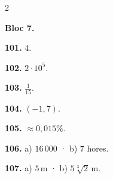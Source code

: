 \documentclass[13pt,a4paper]{extarticle}
\begin{document}
\begin{multicols}{2}
\begin{minipage}{\linewidth}
\textbf{Bloc 7.}\par
\end{minipage}\par\vspace{1.6mm}
\par\noindent\begin{minipage}{\linewidth}
\textbf{101.} $4$.\par
\end{minipage}\par\vspace{1.6mm}
\par\noindent\begin{minipage}{\linewidth}
\textbf{102.} $2\cdot10^5$.\par
\end{minipage}\par\vspace{1.6mm}
\par\noindent\begin{minipage}{\linewidth}
\textbf{103.} $\tfrac1{15}$.\par
\end{minipage}\par\vspace{1.6mm}
\par\noindent\begin{minipage}{\linewidth}
\textbf{104.} $\left(-1,7\right)$.\par
\end{minipage}\par\vspace{1.6mm}
\par\noindent\begin{minipage}{\linewidth}
\textbf{105.} $\approx0{,}015\%$.\par
\end{minipage}\par\vspace{1.6mm}
\par\noindent\begin{minipage}{\linewidth}
\textbf{106.} a) $16\,000$ · b) $7$ hores.\par
\end{minipage}\par\vspace{1.6mm}
\par\noindent\begin{minipage}{\linewidth}
\textbf{107.} a) $5\,\text{m}$ · b) $5\sqrt[3]{2}\,\text{m}$.\par
\end{minipage}\par\vspace{1.6mm}

\end{multicols}
\end{document}
